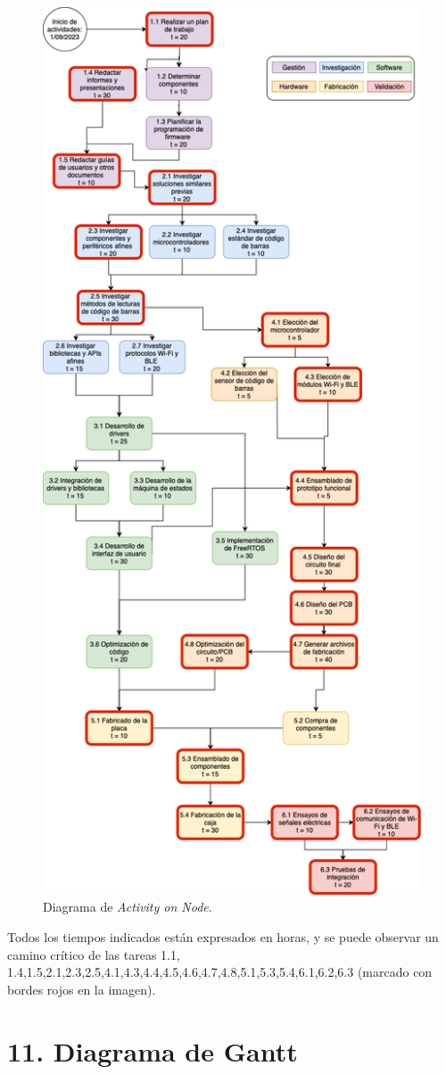 \documentclass[
11pt, %
codirector, %
]{charter}
\begin{document}
\begin{figure}[htpb]
\centering 
\includegraphics[width=.65\textwidth]{./Figuras/diagramaAoN.png}
\caption{Diagrama de \textit{Activity on Node}.}
\label{fig:AoN}
\end{figure}

Todos los tiempos indicados están expresados en horas, y se puede observar un camino crítico de las tareas 1.1, 1.4,1.5,2.1,2.3,2.5,4.1,4.3,4.4,4.5,4.6,4.7,4.8,5.1,5.3,5.4,6.1,6.2,6.3 (marcado con bordes rojos en la imagen). 



\section{11. Diagrama de Gantt}
\label{sec:gantt}
\end{document}
